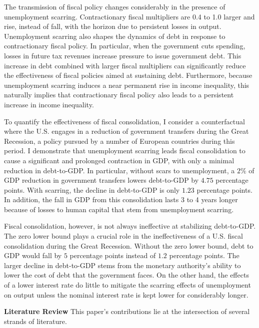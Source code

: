 The transmission of fiscal policy changes considerably in the presence of unemployment scarring. Contractionary fiscal multipliers are 0.4 to 1.0 larger and rise, instead of fall, with the horizon due to persistent losses in output. Unemployment scarring also shapes the dynamics of debt in response to contractionary fiscal policy. In particular, when the government cuts spending, losses in future tax revenues increase pressure to issue government debt. This increase in debt combined with larger fiscal multipliers can significantly reduce the effectiveness of fiscal policies aimed at sustaining debt. Furthermore, because unemployment scarring induces a near permanent rise in income inequality, this naturally implies that contractionary fiscal policy also leads to a persistent increase in income inequality.

To quantify the effectiveness of fiscal consolidation, I consider a counterfactual where the U.S. engages in a reduction of government transfers during the Great Recession, a policy pursued by a number of European countries during this period. I demonstrate that unemployment scarring leads fiscal consolidation to cause a significant and prolonged contraction in GDP, with only a minimal reduction in debt-to-GDP. In particular, without scars to unemployment, a  $2\%$ of GDP reduction in government transfers lowers debt-to-GDP by $4.75$ percentage points. With scarring, the decline in debt-to-GDP is only $1.23$ percentage points. In addition, the fall in GDP from this consolidation lasts 3 to 4 years longer because of losses to human capital that stem from unemployment scarring.

Fiscal consolidation, however, is not always ineffective at stabilizing debt-to-GDP. The zero lower bound plays a crucial role in the ineffectiveness of a U.S. fiscal consolidation during the Great Recession. Without the zero lower bound, debt to GDP would fall by $5$ percentage points instead of $1.2$ percentage points. The larger decline in debt-to-GDP stems from the monetary authority's ability to lower the cost of debt that the government faces. On the other hand, the effects of a lower interest rate do little to mitigate the scarring effects of unemployment on output unless the nominal interest rate is kept lower for considerably longer. 

\textbf{Literature Review} This paper's contributions lie at the intersection of several strands of literature. 


